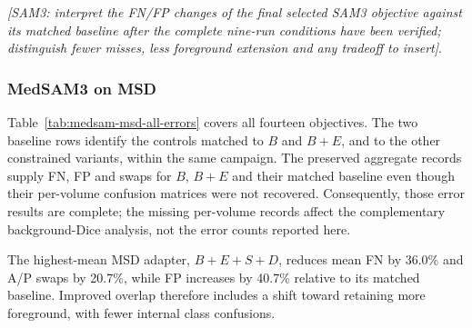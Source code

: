 \documentclass[12pt,a4paper]{article}
\newcommand{\samResult}[1]{\textit{[SAM3: #1 to insert]}}
\begin{document}
\noindent\samResult{interpret the FN/FP changes of the final selected
SAM3 objective against its matched baseline after the complete
nine-run conditions have been verified; distinguish fewer misses,
less foreground extension and any tradeoff}.

\subsubsection{MedSAM3 on MSD}

Table~\ref{tab:medsam-msd-all-errors} covers all fourteen objectives.
The two baseline rows identify the controls matched to $B$ and $B+E$,
and to the other constrained variants, within the same campaign.
The preserved aggregate records supply FN, FP and swaps for $B$, $B+E$
and their matched baseline even though their per-volume confusion
matrices were not recovered. Consequently, those error results are
complete; the missing per-volume records affect the complementary
background-Dice analysis, not the error counts reported here.

The highest-mean MSD adapter, $B+E+S+D$, reduces mean FN by 36.0\%
and A/P swaps by 20.7\%, while FP increases by 40.7\% relative to its
matched baseline. Improved overlap therefore includes a shift toward
retaining more foreground, with fewer internal class confusions.
\end{document}
